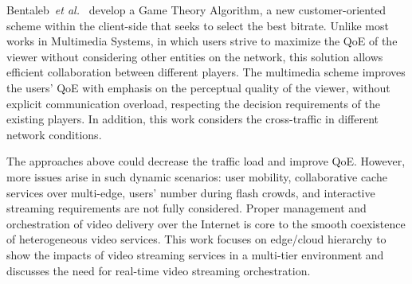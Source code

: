 Bentaleb~\textit{et al.}~\cite{bentaleb:2018:MSys} develop a Game Theory Algorithm, a new customer-oriented scheme within the client-side that seeks to select the best bitrate. Unlike most works in Multimedia Systems, in which users strive to maximize the QoE of the viewer without considering other entities on the network, this solution allows efficient collaboration between different players. The multimedia scheme improves the users' QoE with emphasis on the perceptual quality of the viewer, without explicit communication overload, respecting the decision requirements of the existing players. In addition, this work considers the cross-traffic in different network conditions.

The approaches above could decrease the traffic load and improve QoE. However, more issues arise in such dynamic scenarios: user mobility, collaborative cache services over multi-edge, users' number during flash crowds, and interactive streaming requirements are not fully considered. Proper management and orchestration of video delivery over the Internet is core to the smooth coexistence of heterogeneous video services. This work focuses on edge/cloud hierarchy to show the impacts of video streaming services in a multi-tier environment and discusses the need for real-time video streaming orchestration.

%
%
